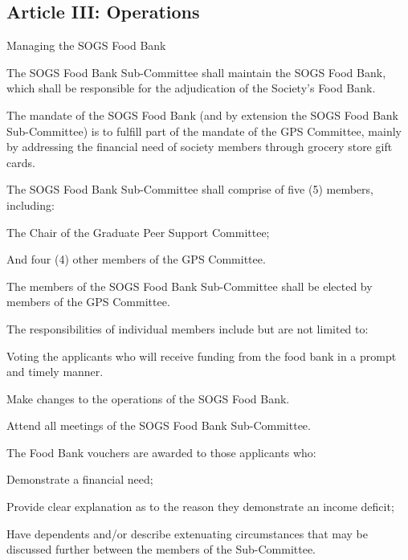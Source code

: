 \subsection{Article III: Operations}
\begin{longenum}[ label*=\thesubsection.\arabic*., align=left] 
\item Managing the SOGS Food Bank
		\begin{longenum}[label*=\arabic*., align=left]	
		\item The SOGS Food Bank Sub-Committee shall maintain the SOGS Food Bank, which shall be responsible for the adjudication of the Society’s Food Bank.
		\item The mandate of the SOGS Food Bank (and by extension the SOGS Food Bank Sub-Committee) is to fulfill part of the mandate of the GPS Committee, mainly by addressing the financial need of society members through grocery store gift cards.
		\item The SOGS Food Bank Sub-Committee shall comprise of five (5) members, including:
			\begin{longenum}[label*=\arabic*., align=left]
			\item The Chair of the Graduate Peer Support Committee;
			\item And four (4) other members of the GPS Committee.
			\end{longenum}
		\item The members of the SOGS Food Bank Sub-Committee shall be elected by members of the GPS Committee.
		\item The responsibilities of individual members include but are not limited to:
			\begin{longenum}[label*=\arabic*., align=left]
			\item Voting the applicants who will receive funding from the food bank in a prompt and timely manner.
			\item Make changes to the operations of the SOGS Food Bank.
			\item Attend all meetings of the SOGS Food Bank Sub-Committee.
			\end{longenum}
		\item The Food Bank vouchers are awarded to those applicants who:
			\begin{longenum}[label*=\arabic*., align=left]	
			\item Demonstrate a financial need;
			\item Provide clear explanation as to the reason they demonstrate an income deficit;
			\item Have dependents and/or describe extenuating circumstances that may be discussed further between the members of the Sub-Committee.			

\end{longenum}
\end{longenum}
\end{longenum}
